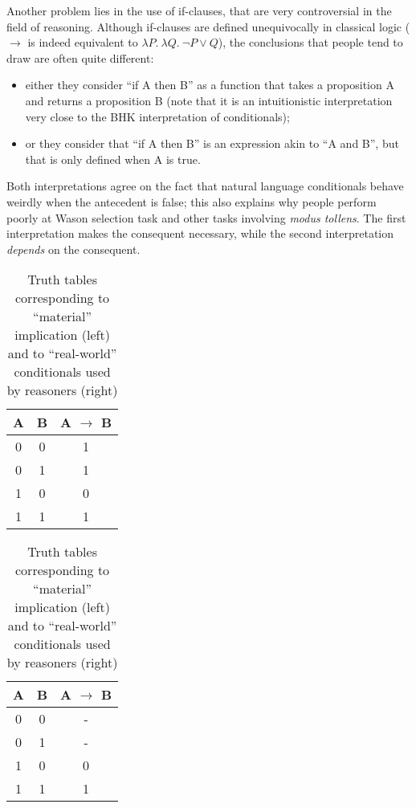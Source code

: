 \documentclass[french]{article}
\begin{document}
Another problem lies in the use of if-clauses, that are very controversial in the field of reasoning. Although if-clauses are defined unequivocally in classical logic ($\rightarrow$ is indeed equivalent to $\lambda P. \ \lambda Q. \ \neg P \vee Q$), the conclusions that people tend to draw are often quite different:
\begin{itemize}
	\item either they consider ``if A then B'' as a function that takes a proposition A and returns a proposition B (note that it is an intuitionistic interpretation very close to the BHK interpretation of conditionals);
	\item or they consider that ``if A then B'' is an expression akin to ``A and B'', but that is only defined when A is true.
\end{itemize}
Both interpretations agree on the fact that natural language conditionals behave weirdly when the antecedent is false; this also explains why people perform poorly at Wason selection task and other tasks involving \textit{modus tollens}. The first interpretation makes the consequent necessary, while the second interpretation \textit{depends} on the consequent.
\begin{table}
	\centering
	\begin{tabular}{c|c|c}
		A & B & A $\rightarrow$ B \\ \hline
		0&0&1\\
		0&1&1\\
		1&0&0\\
		1&1&1\\
	\end{tabular}\qquad
\begin{tabular}{c|c|c}
	A & B & A $\rightarrow$ B \\ \hline
	0&0& -\\
	0&1& -\\
	1&0&0\\
	1&1&1\\
\end{tabular}
\caption{Truth tables corresponding to ``material'' implication (left) and to ``real-world'' conditionals used by reasoners  (right)}
\end{table}
\end{document}
